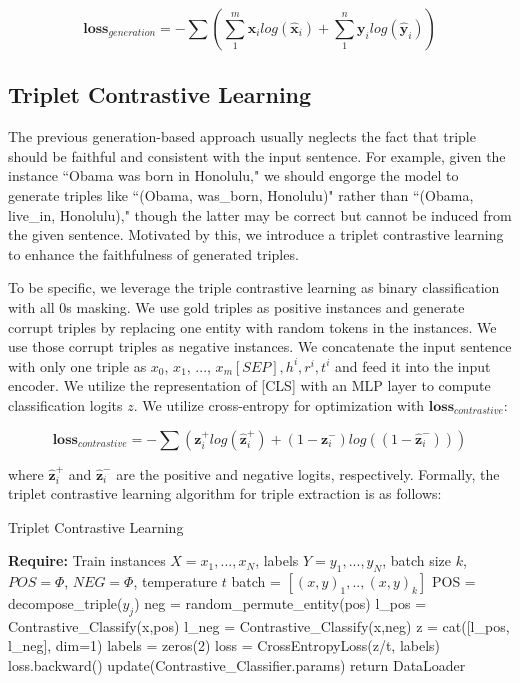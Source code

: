 \documentclass[letterpaper]{article} \usepackage{aaai21}  \usepackage{times}  \usepackage{helvet} \usepackage{courier}  \usepackage[hyphens]{url}  \usepackage{graphicx} \urlstyle{rm} \def\UrlFont{\rm}  \usepackage{natbib}  \usepackage[noend]{algpseudocode}
\begin{document}
\begin{equation}
\mathbf{loss}_{generation} = -\sum (\sum_{1}^m \mathbf{x}_{i} log(\hat{\mathbf{x}}_{i}) + \sum_{1}^n  \mathbf{y}_{i} log(\hat{\mathbf{y}}_{i}))
\end{equation}

\subsection{Triplet Contrastive Learning}
The previous generation-based approach usually neglects the fact that triple should be faithful and consistent with the input sentence. For example, given the instance ``Obama was born in Honolulu," we should engorge the model to generate triples like ``(Obama, was\_born, Honolulu)" rather than ``(Obama, live\_in, Honolulu)," though the latter may be correct but cannot be induced from the given sentence. Motivated by this, we introduce a triplet contrastive learning to enhance the faithfulness of generated triples.

To be specific, we leverage the triple contrastive learning as binary classification with all $0$s masking. We use gold triples as positive instances and generate corrupt triples by replacing one entity with random tokens in the instances. We use those corrupt triples as negative instances. We concatenate the input sentence with only one triple as $x_0$, $x_1$, ..., $x_m [SEP], h^{i},r^{i},t^{i}$ and feed it into the input encoder. We utilize the representation of [CLS] with an MLP layer to compute classification logits $z$. We utilize cross-entropy for optimization with $\mathbf{loss}_{contrastive}$:

\begin{equation}
\mathbf{loss}_{contrastive} = -\sum (\mathbf{z}^{+}_{i} log(\hat{\mathbf{z}}^{+}_{i}) + (1-\mathbf{z}^{-}_{i}) log((1-\hat{\mathbf{z}}^{-}_{i})))
\end{equation}

where $\hat{\mathbf{z}}^{+}_{i}$ and $\hat{\mathbf{z}}^{-}_{i}$ are the positive and negative logits, respectively. Formally, the triplet contrastive learning algorithm for triple extraction is as follows:

\begin{algorithm}[th]
\begin{algorithmic}[1]
\caption{Triplet Contrastive Learning} 
 \State \textbf{Require:} Train instances $X={x_1,...,x_N}$, labels $Y={y_1,...,y_N}$,  batch size $k$, $POS = \Phi$, $NEG = \Phi$, temperature $t$
   \State batch = $[(x,y)_1,..,(x,y)_k]$
    \State POS = decompose\_triple($y_j$)
    \State neg = random\_permute\_entity(pos)
    \State l\_pos = Contrastive\_Classify(x,pos)
    \State l\_neg = Contrastive\_Classify(x,neg)
    \State z = cat([l\_pos, l\_neg], dim=1)
\State labels = zeros(2) 
    \State loss = CrossEntropyLoss(z/t, labels)
    \State loss.backward()
    \State update(Contrastive\_Classifier.params)
     \EndFor
    \EndFor
   \EndWhile
   \State return DataLoader
\label{batch} 
\end{algorithmic}
\end{algorithm}
\end{document}
